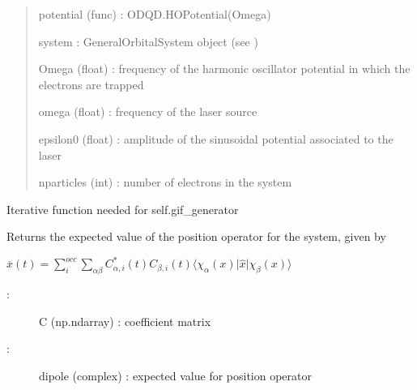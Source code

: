 \documentclass[letterpaper,10pt,english]{sphinxmanual}
\begin{document}
\begin{fulllineitems}
\begin{quote}
potential (func) : ODQD.HOPotential(Omega)

system : GeneralOrbitalSystem object (see )

Omega (float) : frequency of the harmonic oscillator potential in which the electrons are trapped

omega (float) : frequency of the laser source

epsilon0 (float) : amplitude of the sinusoidal potential associated to the laser

nparticles (int) : number of electrons in the system
\end{quote}

\begin{fulllineitems}
\label{\detokenize{index:do.GHF.anima}}
Iterative function needed for self.gif\_generator

\end{fulllineitems}


\begin{fulllineitems}
\label{\detokenize{index:do.GHF.eval_dipole}}
Returns the expected value of the position operator for the system, given by

\(\overline{x}(t) = \sum_i^{occ} \sum_{\alpha\beta} C_{\alpha,i}^*(t) C_{\beta,i} (t) \langle \chi_{\alpha}(x) \vert \hat{x} \vert \chi_{\beta}(x)\rangle\)
\begin{description}
\item[{:}] \leavevmode
C (np.ndarray) : coefficient matrix

\item[{:            }] \leavevmode
dipole (complex) : expected value for position operator

\end{description}

\end{fulllineitems}



\end{fulllineitems}
\end{document}
